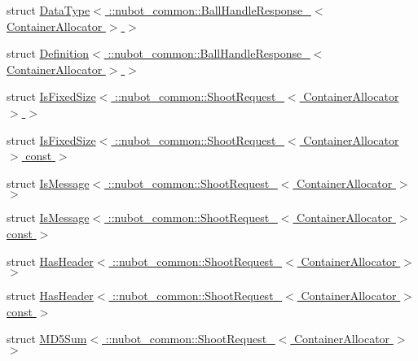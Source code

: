 \begin{DoxyCompactItemize}
\item 
struct \hyperlink{structros_1_1message__traits_1_1DataType_3_01_1_1nubot__common_1_1BallHandleResponse___3_01ContainerAllocator_01_4_01_4}{Data\-Type$<$ \-::nubot\-\_\-common\-::\-Ball\-Handle\-Response\-\_\-$<$ Container\-Allocator $>$ $>$}
\item 
struct \hyperlink{structros_1_1message__traits_1_1Definition_3_01_1_1nubot__common_1_1BallHandleResponse___3_01ContainerAllocator_01_4_01_4}{Definition$<$ \-::nubot\-\_\-common\-::\-Ball\-Handle\-Response\-\_\-$<$ Container\-Allocator $>$ $>$}
\item 
struct \hyperlink{structros_1_1message__traits_1_1IsFixedSize_3_01_1_1nubot__common_1_1ShootRequest___3_01ContainerAllocator_01_4_01_4}{Is\-Fixed\-Size$<$ \-::nubot\-\_\-common\-::\-Shoot\-Request\-\_\-$<$ Container\-Allocator $>$ $>$}
\item 
struct \hyperlink{structros_1_1message__traits_1_1IsFixedSize_3_01_1_1nubot__common_1_1ShootRequest___3_01ContainerAllocator_01_4_01const_01_01_4}{Is\-Fixed\-Size$<$ \-::nubot\-\_\-common\-::\-Shoot\-Request\-\_\-$<$ Container\-Allocator $>$ const  $>$}
\item 
struct \hyperlink{structros_1_1message__traits_1_1IsMessage_3_01_1_1nubot__common_1_1ShootRequest___3_01ContainerAllocator_01_4_01_4}{Is\-Message$<$ \-::nubot\-\_\-common\-::\-Shoot\-Request\-\_\-$<$ Container\-Allocator $>$ $>$}
\item 
struct \hyperlink{structros_1_1message__traits_1_1IsMessage_3_01_1_1nubot__common_1_1ShootRequest___3_01ContainerAllocator_01_4_01const_01_01_4}{Is\-Message$<$ \-::nubot\-\_\-common\-::\-Shoot\-Request\-\_\-$<$ Container\-Allocator $>$ const  $>$}
\item 
struct \hyperlink{structros_1_1message__traits_1_1HasHeader_3_01_1_1nubot__common_1_1ShootRequest___3_01ContainerAllocator_01_4_01_4}{Has\-Header$<$ \-::nubot\-\_\-common\-::\-Shoot\-Request\-\_\-$<$ Container\-Allocator $>$ $>$}
\item 
struct \hyperlink{structros_1_1message__traits_1_1HasHeader_3_01_1_1nubot__common_1_1ShootRequest___3_01ContainerAllocator_01_4_01const_01_01_4}{Has\-Header$<$ \-::nubot\-\_\-common\-::\-Shoot\-Request\-\_\-$<$ Container\-Allocator $>$ const  $>$}
\item 
struct \hyperlink{structros_1_1message__traits_1_1MD5Sum_3_01_1_1nubot__common_1_1ShootRequest___3_01ContainerAllocator_01_4_01_4}{M\-D5\-Sum$<$ \-::nubot\-\_\-common\-::\-Shoot\-Request\-\_\-$<$ Container\-Allocator $>$ $>$}
\item 

\end{DoxyCompactItemize}
